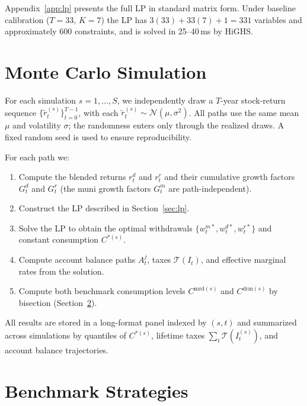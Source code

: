 \documentclass[12pt]{article}
\newcommand{\Tax}{\mathcal{T}}
\begin{document}
Appendix~\ref{app:lp} presents the full LP in standard matrix form.
Under baseline calibration ($T = 33$, $K = 7$) the LP has $3(33) + 33(7) + 1
= 331$ variables and approximately 600 constraints, and is solved in
25--40\,ms by HiGHS.

\section{Monte Carlo Simulation}
\label{sec:mc}

For each simulation $s = 1, \ldots, S$, we independently draw a $T$-year
stock-return sequence $\{\tilde{r}^{(s)}_t\}_{t=0}^{T-1}$, with each
$\tilde{r}^{(s)}_t \sim \mathcal{N}(\mu, \sigma^2)$. All paths use the same
mean $\mu$ and volatility $\sigma$; the randomness enters only through the
realized draws. A fixed random seed is used to ensure reproducibility.

For each path we:
\begin{enumerate}[leftmargin=2em]
  \item Compute the blended returns $r^d_t$ and $r^r_t$ and their cumulative
        growth factors $G^d_t$ and $G^r_t$ (the muni growth factors $G^m_t$
        are path-independent).
  \item Construct the LP described in Section~\ref{sec:lp}.
  \item Solve the LP to obtain the optimal withdrawals
        $\{w^{m*}_t, w^{d*}_t, w^{r*}_t\}$ and constant consumption $C^{*(s)}$.
  \item Compute account balance paths $A^j_t$, taxes $\Tax(I_t)$,
        and effective marginal rates from the solution.
  \item Compute both benchmark consumption levels $C^{\mathrm{mrd}(s)}$ and
        $C^{\mathrm{drm}(s)}$ by bisection (Section~\ref{sec:benchmarks}).
\end{enumerate}

All results are stored in a long-format panel indexed by $(s, t)$ and
summarized across simulations by quantiles of $C^{*(s)}$, lifetime taxes
$\sum_t \Tax(I^{(s)}_t)$, and account balance trajectories.

\section{Benchmark Strategies}
\label{sec:benchmarks}
\end{document}
